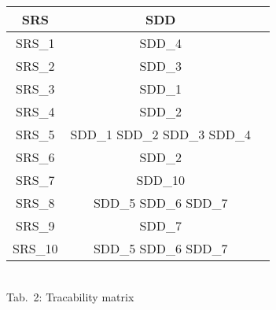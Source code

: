 \documentclass[twoside,10pt]{article}
\begin{document}
\begin{multicols}{2}
\centering
\begin{tabular}{ccc}
\hline
\bf SRS & \bf SDD  \\
\hline
\hline
SRS\_1 & SDD\_4\\
SRS\_2 & SDD\_3\\
SRS\_3 & SDD\_1\\
SRS\_4 & SDD\_2\\
SRS\_5 & SDD\_1 SDD\_2 SDD\_3 SDD\_4\\
SRS\_6 & SDD\_2\\
SRS\_7 & SDD\_10\\
SRS\_8 & SDD\_5 SDD\_6 SDD\_7\\
SRS\_9 & SDD\_7\\
SRS\_10 &  SDD\_5 SDD\_6 SDD\_7\\
\hline
\end{tabular}
~\\

Tab.~2: Tracability matrix






\end{multicols}
\end{document}
